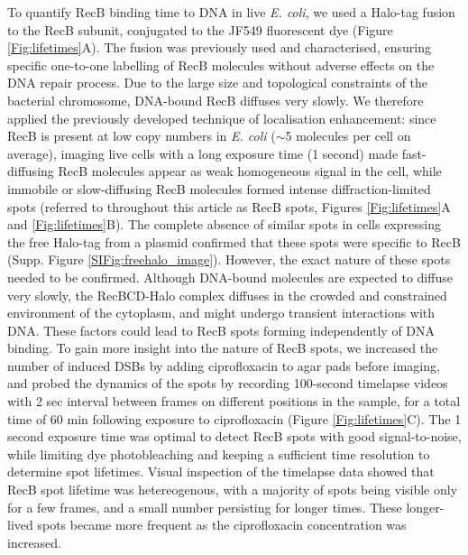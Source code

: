 To quantify RecB binding time to DNA in live \textit{E. coli}, we used a Halo-tag fusion to the RecB subunit, conjugated to the JF549 fluorescent dye (Figure \ref{Fig:lifetimes}A). The fusion was previously used and characterised, ensuring specific one-to-one labelling of RecB molecules without adverse effects on the DNA repair process\cite{Lepore2019a,Lepore2023}. Due to the large size and topological constraints of the bacterial chromosome, DNA-bound RecB diffuses very slowly\cite{Lepore2023}. We therefore applied the previously developed technique of localisation enhancement\cite{Yu2006, Elf2007}: since RecB is present at low copy numbers in \textit{E. coli} ($\sim$5 molecules per cell on average\cite{Lepore2019a}), imaging live cells with a long exposure time (1 second) made fast-diffusing RecB molecules appear as weak homogeneous signal in the cell, while immobile or slow-diffusing RecB molecules formed intense diffraction-limited spots (referred to throughout this article as RecB spots, Figures \ref{Fig:lifetimes}A and \ref{Fig:lifetimes}B). The complete absence of similar spots in cells expressing the free Halo-tag from a plasmid confirmed that these spots were specific to RecB (Supp. Figure \ref{SIFig:freehalo_image}). However, the exact nature of these spots needed to be confirmed. Although DNA-bound molecules are expected to diffuse very slowly, the RecBCD-Halo complex diffuses in the crowded and constrained environment of the cytoplasm, and might undergo transient interactions with DNA\cite{Lepore2023}. These factors could lead to RecB spots forming independently of DNA binding. To gain more insight into the nature of RecB spots, we increased the number of induced DSBs by adding ciprofloxacin to agar pads before imaging, and probed the dynamics of the spots by recording 100-second timelapse videos with 2 sec interval between frames on different positions in the sample, for a total time of 60 min following exposure to ciprofloxacin (Figure \ref{Fig:lifetimes}C). The 1 second exposure time was optimal to detect RecB spots with good signal-to-noise, while limiting dye photobleaching and keeping a sufficient time resolution to determine spot lifetimes. Visual inspection of the timelapse data showed that RecB spot lifetime was hetereogenous, with a majority of spots being visible only for a few frames, and a small number persisting for longer times. These longer-lived spots became more frequent as the ciprofloxacin concentration was increased.

